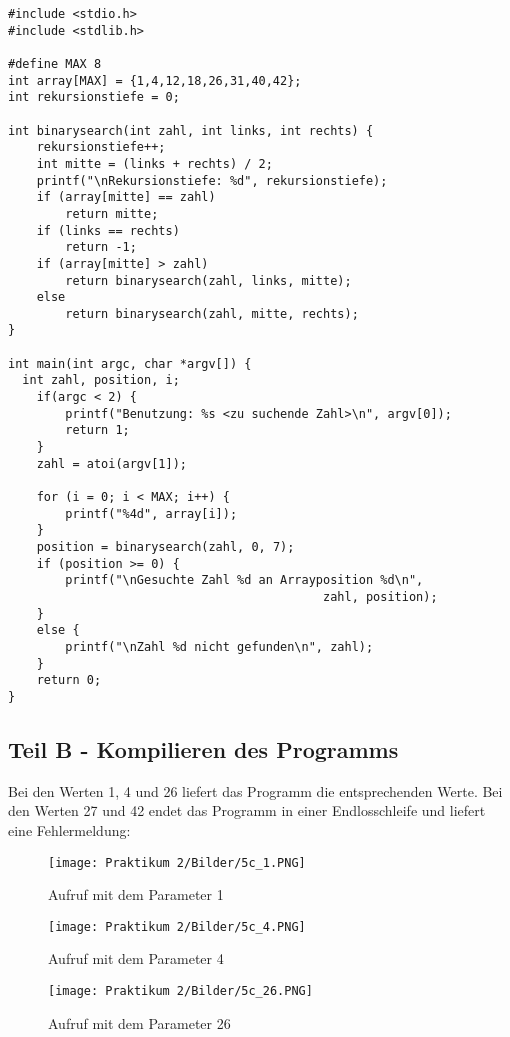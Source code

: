 \documentclass[12pt]{article}
\begin{document}
\begin{lstlisting}
#include <stdio.h>
#include <stdlib.h>

#define MAX 8 
int array[MAX] = {1,4,12,18,26,31,40,42};
int rekursionstiefe = 0;

int binarysearch(int zahl, int links, int rechts) {
    rekursionstiefe++;
    int mitte = (links + rechts) / 2;
    printf("\nRekursionstiefe: %d", rekursionstiefe);
    if (array[mitte] == zahl)
        return mitte; 
    if (links == rechts)
        return -1; 
    if (array[mitte] > zahl)
        return binarysearch(zahl, links, mitte); 
    else
        return binarysearch(zahl, mitte, rechts);
}

int main(int argc, char *argv[]) {
  int zahl, position, i;
    if(argc < 2) {
        printf("Benutzung: %s <zu suchende Zahl>\n", argv[0]);
        return 1;
    }
    zahl = atoi(argv[1]);

    for (i = 0; i < MAX; i++) {
        printf("%4d", array[i]);
    }
    position = binarysearch(zahl, 0, 7); 
    if (position >= 0) {
        printf("\nGesuchte Zahl %d an Arrayposition %d\n", 
                                            zahl, position);
    }
    else {
        printf("\nZahl %d nicht gefunden\n", zahl);
    }
    return 0;
}
\end{lstlisting}
\newpage

\subsection{Teil B - Kompilieren des Programms}
Bei den Werten 1, 4 und 26 liefert das Programm die entsprechenden Werte. Bei den Werten 27 und 42 endet das Programm in einer Endlosschleife und liefert eine Fehlermeldung:\\

\begin{figure}[htbp]
    \centering
    \texttt{[image: Praktikum 2/Bilder/5c\_1.PNG]}
    \caption{Aufruf mit dem Parameter 1}
\end{figure}

\begin{figure}[htbp]
    \centering
    \texttt{[image: Praktikum 2/Bilder/5c\_4.PNG]}
    \caption{Aufruf mit dem Parameter 4}
\end{figure}

\begin{figure}[htbp]
    \centering
    \texttt{[image: Praktikum 2/Bilder/5c\_26.PNG]}
    \caption{Aufruf mit dem Parameter 26}
\end{figure}
\end{document}
